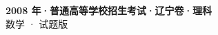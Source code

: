 \documentclass[zihao=-4, a4paper]{ctexart}
\begin{document}
\begin{center}
  {\Large\bfseries 2008 年·普通高等学校招生考试·辽宁卷·理科}\\[4pt]
  {\large 数学 · 试题版}
\end{center}
\medskip
{}

\end{document}

